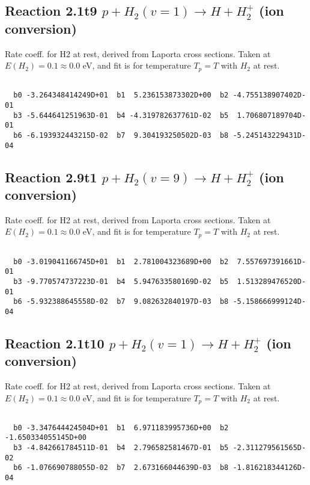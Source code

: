 \documentclass[12pt,dvipdfmx]{article}
\begin{document}
\newpage
\subsection{
Reaction 2.1t9
$ p + H_2(v=1) \rightarrow H + H_2^+$ (ion conversion)
}
Rate coeff. for H2 at rest, derived from Laporta cross sections.
Taken at $E(H_2) = 0.1 \approx 0.0$ eV,  and fit is for temperature $T_p=T$ with $H_2$ at rest.

\begin{small}\begin{verbatim}

  b0 -3.264348414249D+01  b1  5.236153873302D+00  b2 -4.755138907402D-01
  b3 -5.644641251963D-01  b4 -4.319782637761D-02  b5  1.706807189704D-01
  b6 -6.193932443215D-02  b7  9.304193250502D-03  b8 -5.245143229431D-04

\end{verbatim}\end{small}

\newpage
\subsection{
Reaction 2.9t1
$ p + H_2(v=9) \rightarrow H + H_2^+$ (ion conversion)
}
Rate coeff. for H2 at rest, derived from Laporta cross sections.
Taken at $E(H_2) = 0.1 \approx 0.0$ eV,  and fit is for temperature $T_p=T$ with $H_2$ at rest.

\begin{small}\begin{verbatim}

  b0 -3.019041166745D+01  b1  2.781004323689D+00  b2  7.557697391661D-01
  b3 -9.770574737223D-01  b4  5.947633580169D-02  b5  1.513289476520D-01
  b6 -5.932388645558D-02  b7  9.082632840197D-03  b8 -5.158666999124D-04

\end{verbatim}\end{small}

\newpage
\subsection{
Reaction 2.1t10
$ p + H_2(v=1) \rightarrow H + H_2^+$ (ion conversion)
}
Rate coeff. for H2 at rest, derived from Laporta cross sections.
Taken at $E(H_2) = 0.1 \approx 0.0$ eV,  and fit is for temperature $T_p=T$ with $H_2$ at rest.

\begin{small}\begin{verbatim}

  b0 -3.347644424504D+01  b1  6.971183995736D+00  b2 -1.650334055145D+00
  b3 -4.842661784511D-01  b4  2.796582581467D-01  b5 -2.311279561565D-02
  b6 -1.076690788055D-02  b7  2.673166044639D-03  b8 -1.816218344126D-04

\end{verbatim}\end{small}
\end{document}

